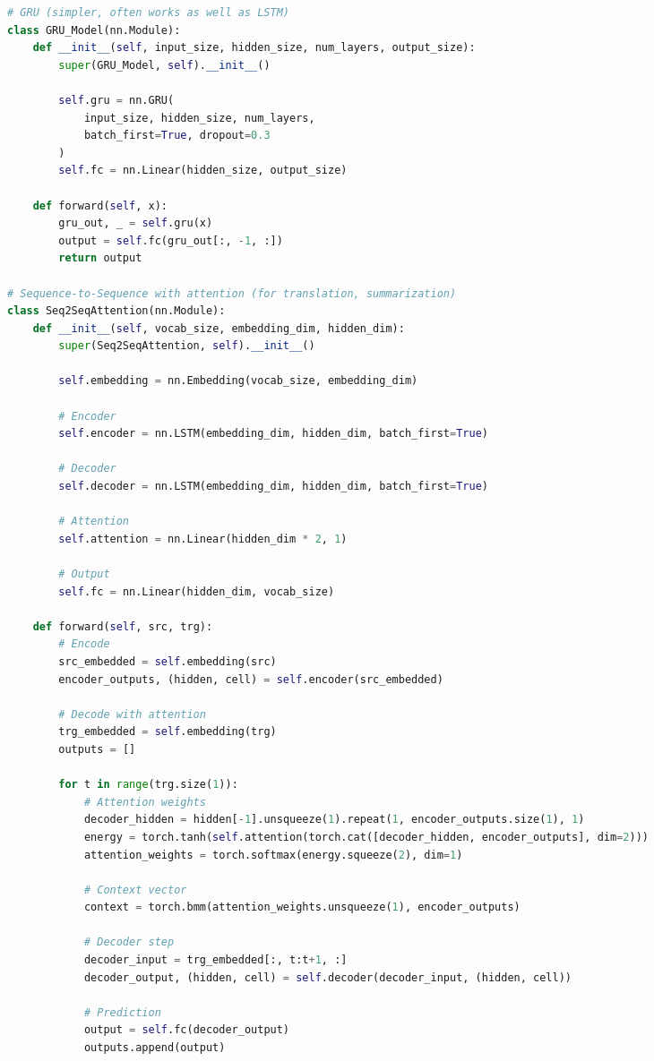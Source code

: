 \documentclass[8pt,landscape]{article}
\begin{document}
\begin{multicols}{3}
\begin{lstlisting}[language=Python]
# GRU (simpler, often works as well as LSTM)
class GRU_Model(nn.Module):
    def __init__(self, input_size, hidden_size, num_layers, output_size):
        super(GRU_Model, self).__init__()

        self.gru = nn.GRU(
            input_size, hidden_size, num_layers,
            batch_first=True, dropout=0.3
        )
        self.fc = nn.Linear(hidden_size, output_size)

    def forward(self, x):
        gru_out, _ = self.gru(x)
        output = self.fc(gru_out[:, -1, :])
        return output

# Sequence-to-Sequence with attention (for translation, summarization)
class Seq2SeqAttention(nn.Module):
    def __init__(self, vocab_size, embedding_dim, hidden_dim):
        super(Seq2SeqAttention, self).__init__()

        self.embedding = nn.Embedding(vocab_size, embedding_dim)

        # Encoder
        self.encoder = nn.LSTM(embedding_dim, hidden_dim, batch_first=True)

        # Decoder
        self.decoder = nn.LSTM(embedding_dim, hidden_dim, batch_first=True)

        # Attention
        self.attention = nn.Linear(hidden_dim * 2, 1)

        # Output
        self.fc = nn.Linear(hidden_dim, vocab_size)

    def forward(self, src, trg):
        # Encode
        src_embedded = self.embedding(src)
        encoder_outputs, (hidden, cell) = self.encoder(src_embedded)

        # Decode with attention
        trg_embedded = self.embedding(trg)
        outputs = []

        for t in range(trg.size(1)):
            # Attention weights
            decoder_hidden = hidden[-1].unsqueeze(1).repeat(1, encoder_outputs.size(1), 1)
            energy = torch.tanh(self.attention(torch.cat([decoder_hidden, encoder_outputs], dim=2)))
            attention_weights = torch.softmax(energy.squeeze(2), dim=1)

            # Context vector
            context = torch.bmm(attention_weights.unsqueeze(1), encoder_outputs)

            # Decoder step
            decoder_input = trg_embedded[:, t:t+1, :]
            decoder_output, (hidden, cell) = self.decoder(decoder_input, (hidden, cell))

            # Prediction
            output = self.fc(decoder_output)
            outputs.append(output)


\end{lstlisting}
\end{multicols}
\end{document}
